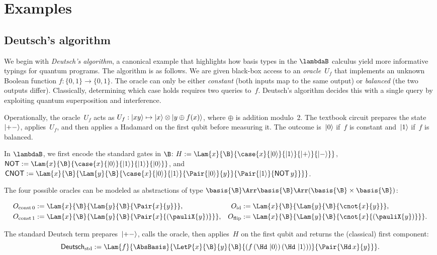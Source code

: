 \section{Examples}\label{sec:examples}
\subsection{Deutsch's algorithm}\label{subsec:deutsch}
We begin with \emph{Deutsch's algorithm}, a canonical example that highlights
how basis types in the $\lambdaB$ calculus yield more informative typings for
quantum programs.
The algorithm is as follows.
We are given black-box access to an \emph{oracle}~$U_f$ that implements an
unknown Boolean function $f:\{0,1\}\to\{0,1\}$.  
The oracle can only be either \emph{constant} (both inputs map to the same
output) or \emph{balanced} (the two outputs differ).  
Classically, determining which case holds requires two queries to~$f$.  
Deutsch's algorithm decides this with a single query by exploiting quantum
superposition and interference.

Operationally, the oracle~$U_f$ acts as
\(
  U_f:\left\vert{xy}\right\rangle\mapsto \left\vert{x}\right\rangle\otimes\left\vert{y\oplus f(x)}\right\rangle
\),
where $\oplus$ is addition modulo~2.  
The textbook circuit prepares the state~$\left\vert{+-}\right\rangle$, applies~$U_f$, and
then applies a Hadamard on the first qubit before measuring it.  
The outcome is~$\left\vert{0}\right\rangle$ if~$f$ is constant and~$\left\vert{1}\right\rangle$ if~$f$ is balanced.

In $\lambdaB$, we first encode the standard gates in $\B$: 
$H := \Lam{x}{\B}{\case{x}{\ket{0}}{\ket{1}}{\ket{+}}{\ket{-}}}$, 
$\mathsf{NOT} := \Lam{x}{\B}{\case{x}{\ket{0}}{\ket{1}}{\ket{1}}{\ket{0}}}$, and 
$\mathsf{CNOT} := \Lam{x}{\B}{\Lam{y}{\B}{\case{x}{\ket{0}}{\ket{1}}{\Pair{\ket{0}}{y}}{\Pair{\ket{1}}{\mathsf{NOT}\,y}}}}$.

The four possible oracles can be modeled as abstractions of type $\basis{\B}\Arr\basis{\B}\Arr(\basis{\B}\times\basis{\B})$:

\begin{align*}
  O_{\mathrm{const}\,0} &:= \Lam{x}{\B}{\Lam{y}{\B}{\Pair{x}{y}}},
  & O_{\mathrm{id}}       &:= \Lam{x}{\B}{\Lam{y}{\B}{\cnot{x}{y}}},\\
  O_{\mathrm{const}\,1} &:= \Lam{x}{\B}{\Lam{y}{\B}{\Pair{x}{(\pauliX{y})}}},
  & O_{\mathrm{flip}}     &:= \Lam{x}{\B}{\Lam{y}{\B}{\cnot{x}{(\pauliX{y})}}}.
\end{align*}

The standard Deutsch term prepares~$\left\vert{+-}\right\rangle$, calls the oracle, then
applies~$H$ on the first qubit and returns the (classical) first component:
\[
  \mathsf{Deutsch}_{\mathrm{std}} :=
  \Lam{f}{\AbsBasis}{
    \LetP{x}{\B}{y}{\B}
      {(f\,(\Hd\,\ket{0})\,(\Hd\,\ket{1}))}
      {\Pair{\Hd\,x}{y}}
  }.
\]

